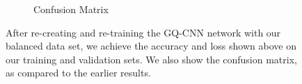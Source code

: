 \begin{figure}[t!]
\begin{subfigure}[t]{0.32\textwidth}
        \caption{Confusion Matrix} \label{fig:confusion_qgcnn}
    \end{subfigure}
\caption{After re-creating and re-training the GQ-CNN network with our balanced data set, we achieve the accuracy and loss shown above on our training and validation sets. We also show the confusion matrix, as compared to the earlier results.} \label{fig:gqcnn_results}
\end{figure}

